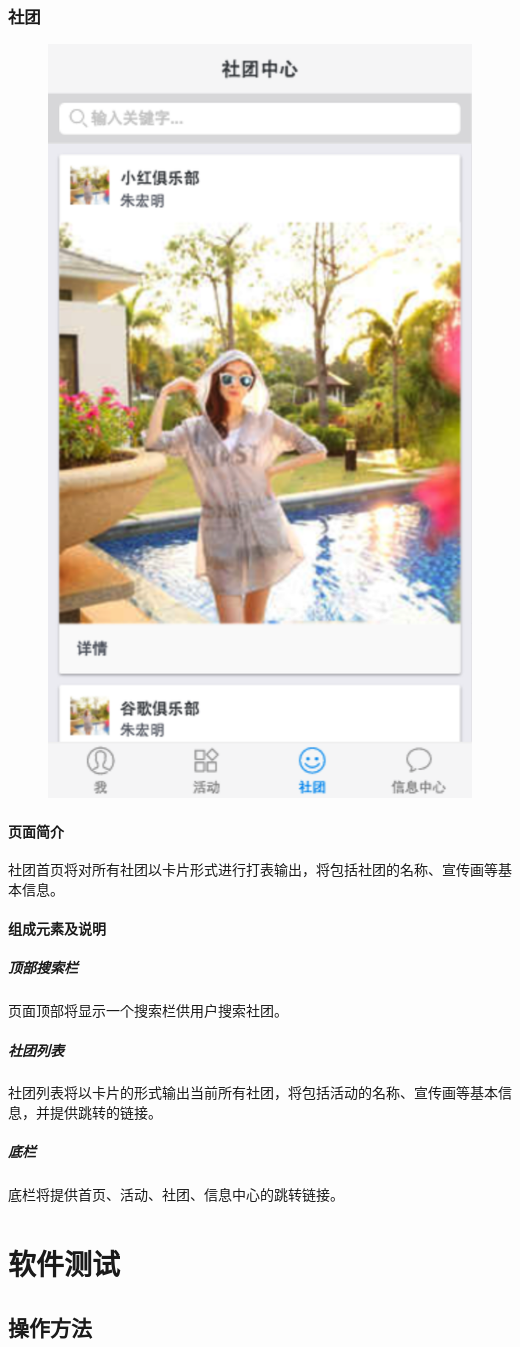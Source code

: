 \documentclass[UTF8]{ctexart}
\begin{document}
\subsubsection{社团}
\begin{figure}[H]
\centering
\includegraphics[width = .5\textwidth]{tong-club-home.png}
\end{figure}
\paragraph{页面简介}
社团首页将对所有社团以卡片形式进行打表输出，将包括社团的名称、宣传画等基本信息。

\paragraph{组成元素及说明}
\subparagraph*{顶部搜索栏}
页面顶部将显示一个搜索栏供用户搜索社团。
\subparagraph*{社团列表}
社团列表将以卡片的形式输出当前所有社团，将包括活动的名称、宣传画等基本信息，并提供跳转的链接。
\subparagraph*{底栏}
底栏将提供首页、活动、社团、信息中心的跳转链接。

\section{软件测试}
\subsection{操作方法}
\end{document}
